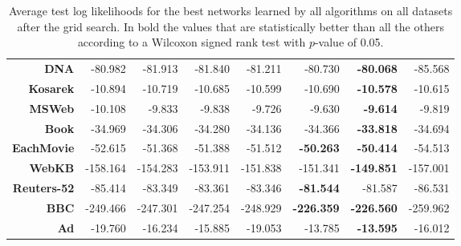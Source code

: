\documentclass[xcolor={usenames,dvipsnames,svgnames}, compress]{beamer}
\begin{document}
\begin{frame}
\begin{table}[!htbp]
\begin{tabular}{r r r r r r r r}
      \textbf{DNA}        & -80.982           & -81.913        & -81.840         & -81.211          & -80.730           & \textbf{-80.068}  & -85.568          \\
      \textbf{Kosarek}    & -10.894           & -10.719        & -10.685         & -10.599          & -10.690           & \textbf{-10.578}  & -10.615          \\
      \textbf{MSWeb}      & -10.108           & -9.833         & -9.838          & -9.726           & -9.630            & \textbf{-9.614}   & -9.819           \\
      \textbf{Book}       & -34.969           & -34.306        & -34.280         & -34.136          & -34.366           & \textbf{-33.818}  & -34.694          \\
      \textbf{EachMovie}  & -52.615           & -51.368        & -51.388         & -51.512          & \textbf{-50.263}  & \textbf{-50.414}  & -54.513          \\
      \textbf{WebKB}      & -158.164          & -154.283       & -153.911        & -151.838         & -151.341          & \textbf{-149.851} & -157.001         \\
      \textbf{Reuters-52} & -85.414           & -83.349        & -83.361         & -83.346          & \textbf{-81.544}  & -81.587           & -86.531          \\
      \textbf{BBC}        & -249.466          & -247.301       & -247.254        & -248.929         & \textbf{-226.359} & \textbf{-226.560} & -259.962         \\
      \textbf{Ad}         & -19.760           & -16.234        & -15.885         & -19.053          & -13.785           & \textbf{-13.595}  & -16.012          \\
      \bottomrule
    \end{tabular}
    \caption[Experimentation results]{Average test
      log likelihoods for the best networks learned by all
      algorithms on all datasets after the grid search. In bold
      the values that are statistically better than all the others
      according to a Wilcoxon signed rank test with $p$-value of 0.05.}
    \label{tab:resexp}
  \end{table}

\end{frame}
\end{document}
